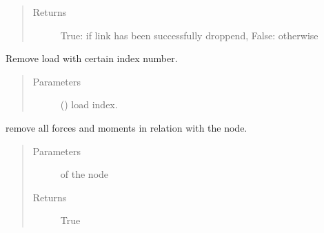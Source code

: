 \documentclass[letterpaper,10pt,english]{sphinxmanual}
\begin{document}
\begin{fulllineitems}
\begin{fulllineitems}
\begin{quote}
\begin{description}
\item[{Returns}] \leavevmode
True: if link has been successfully droppend, False: otherwise

\end{description}\end{quote}

\end{fulllineitems}


\begin{fulllineitems}
\label{\detokenize{api:beamon.database.database.Database.remove_load}}
Remove load with certain index number.
\begin{quote}\begin{description}
\item[{Parameters}] \leavevmode
{} () \textendash{} load index.

\end{description}\end{quote}

\end{fulllineitems}


\begin{fulllineitems}
\label{\detokenize{api:beamon.database.database.Database.remove_loads_with_node}}
remove all forces and moments in relation with the node.
\begin{quote}\begin{description}
\item[{Parameters}] \leavevmode
{} \textendash{} of the node

\item[{Returns}] \leavevmode
True


\end{description}
\end{quote}
\end{fulllineitems}
\end{fulllineitems}
\end{document}
